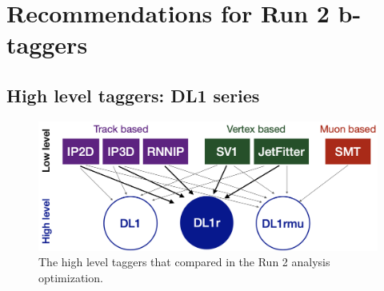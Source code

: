 \section{Recommendations for Run 2 b-taggers}

\subsection{High level taggers: DL1 series}

\begin{figure}[htbp]
  \centering
  \includegraphics[width=\textwidth]{figures/ftag/ATLAS-taggers-all}
  \caption{The high level taggers that compared in the Run 2 analysis optimization.}
  \label{fig:ATLAS-taggers-all}
\end{figure}




